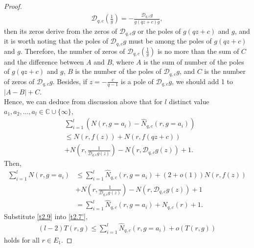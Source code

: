 \documentclass[sn-mathphys-num]{sn-jnl}%
\theoremstyle{thmstyleone}%
\theoremstyle{thmstyletwo}%
\theoremstyle{thmstylethree}%
\begin{document}
\begin{proof}
	\begin{align*}
		\mathcal{D}_{q,c}\left(\frac{1}{g}\right)=-\frac{\mathcal{D}_{q,c}g}{g(qz+c)g},
	\end{align*}
	then its zeros derive from the zeros of $\mathcal{D}_{q,c}g$ or the poles of $g(qz+c)$ and $g$, and it is worth noting that the poles of $\mathcal{D}_{q,c}g$ must be among the poles of $g(qz+c)$ and $g$. Therefore, the number of zeros of $\mathcal{D}_{q,c}\left(\frac{1}{g}\right)$ is no more than the sum of \(C\) and the difference between \(A\) and \(B\), where \(A\) is the sum of number of the poles of \(g(qz+c)\) and \(g\), \(B\) is the number of the poles of $\mathcal{D}_{q,c}g$, and \(C\) is the number of zeros of \(\mathcal{D}_{q,c}g\). Besides, if $z=-\frac{c}{q-1}$ is a pole of $\mathcal{D}_{q,c}g$, we should add 1 to \(|A-B|+C\).\\
	\indent Hence, we can deduce from discussion above that for $l$ distinct value $a_{1},a_{2},\ldots,a_{l}\in\mathbb{C}\cup\{\infty\}$,
	\begin{align}\label{t2.8}
		&\sum_{i=1}^{l}\left(N(r,g=a_{i})-\hat{N}_{q,c}(r,g=a_{i})\right)\nonumber\\
		&\leq N(r,f(z))+N(r,f(qz+c))\\
		&+N\left(r,\frac{1}{\mathcal{D}_{q,c}g(z)}\right)-N(r,\mathcal{D}_{q,c}g(z))+1.\nonumber
	\end{align}
	Then,
	\begin{align}\label{t2.9}
		\sum_{i=1}^{l}N(r,g=a_{i})&\leq\sum_{i=1}^{l}\hat{N}_{q,c}(r,g=a_{i})+(2+o(1))N(r,f(z))\nonumber\\
		&+N\left(r,\frac{1}{\mathcal{D}_{q,c}g(z)}\right)-N(r,\mathcal{D}_{q,c}g(z))+1\\
		&=\sum_{i=1}^{l}\hat{N}_{q,c}(r,g=a_{i})+N_{q,c}(r)+1.\nonumber
	\end{align}			
	Substitute \eqref{t2.9} into \eqref{t2.7'},
	\begin{align*}
		(l-2)T(r,g)\leq\sum_{i=1}^{l}\hat{N}_{q,c}(r,g=a_{i})+o(T(r,g))
	\end{align*}
	holds for all \(r\in E_{1}\).
\end{proof}
\end{document}
